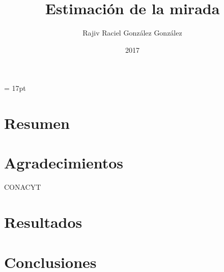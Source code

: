 \documentclass[12pt,oneside]{book}
\begin{document}
\baselineskip = 17pt


\title{ Estimación de la mirada}
\author{Rajiv Raciel González González}
\date{2017}
\maketitle 
\frontmatter

\chapter{Resumen}


\tableofcontents




\listoffigures





\chapter{Agradecimientos}

CONACYT




\mainmatter

   
 






\chapter{Resultados}

\chapter{Conclusiones}

\end{document}

